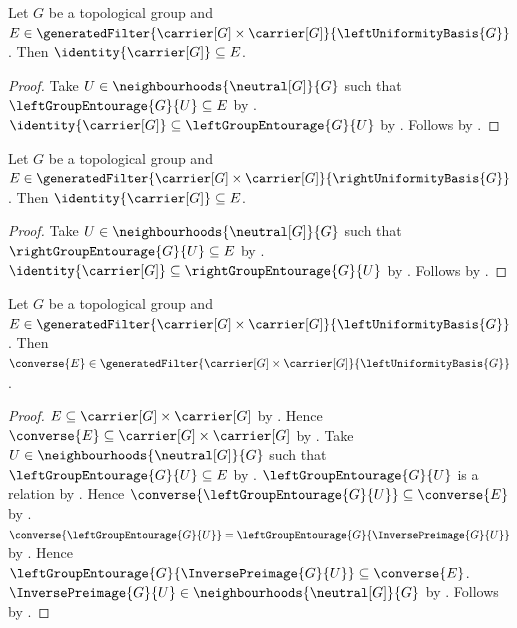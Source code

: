 \begin{proposition}\label{left_generated_uniformity_diagonal}
    Let $G$ be a topological group and
        $E\in\generatedFilter
            {\carrier[G]\times\carrier[G]}{\leftUniformityBasis{G}}$.
    Then $\identity{\carrier[G]}\subseteq E$.
\end{proposition}
\begin{proof}
    Take $U\in\neighbourhoods{\neutral[G]}{G}$ such that
        $\leftGroupEntourage{G}{U}\subseteq E$
        by .
    $\identity{\carrier[G]}\subseteq\leftGroupEntourage{G}{U}$
        by .
    Follows by .
\end{proof}

\begin{proposition}\label{right_generated_uniformity_diagonal}
    Let $G$ be a topological group and
        $E\in\generatedFilter
            {\carrier[G]\times\carrier[G]}{\rightUniformityBasis{G}}$.
    Then $\identity{\carrier[G]}\subseteq E$.
\end{proposition}
\begin{proof}
    Take $U\in\neighbourhoods{\neutral[G]}{G}$ such that
        $\rightGroupEntourage{G}{U}\subseteq E$
        by .
    $\identity{\carrier[G]}\subseteq\rightGroupEntourage{G}{U}$
        by .
    Follows by .
\end{proof}

\begin{proposition}\label{left_generated_uniformity_converse}
    Let $G$ be a topological group and
        $E\in\generatedFilter
            {\carrier[G]\times\carrier[G]}{\leftUniformityBasis{G}}$.
    Then $\converse{E}\in\generatedFilter
        {\carrier[G]\times\carrier[G]}{\leftUniformityBasis{G}}$.
\end{proposition}
\begin{proof}
    $E\subseteq\carrier[G]\times\carrier[G]$
        by .
    Hence $\converse{E}\subseteq\carrier[G]\times\carrier[G]$
        by .
    Take $U\in\neighbourhoods{\neutral[G]}{G}$ such that
        $\leftGroupEntourage{G}{U}\subseteq E$
        by .
    $\leftGroupEntourage{G}{U}$ is a relation
        by .
    Hence $\converse{\leftGroupEntourage{G}{U}}
        \subseteq\converse{E}$ by .
    $\converse{\leftGroupEntourage{G}{U}}
        =\leftGroupEntourage{G}{\InversePreimage{G}{U}}$
        by .
    Hence $\leftGroupEntourage{G}{\InversePreimage{G}{U}}
        \subseteq\converse{E}$.
    $\InversePreimage{G}{U}
        \in\neighbourhoods{\neutral[G]}{G}$
        by .
    Follows by .
\end{proof}

